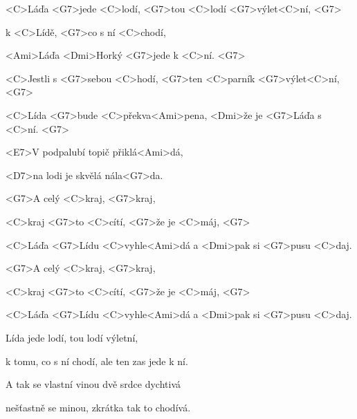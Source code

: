 
\zs
<C>Láďa <G7>jede <C>lodí, <G7>tou <C>lodí <G7>výlet<C>ní, <G7>

k <C>Lídě, <G7>co s ní <C>chodí,

<Ami>Láďa <Dmi>Horký <G7>jede k <C>ní. <G7>

<C>Jestli s <G7>sebou <C>hodí, <G7>ten <C>parník 
<G7>výlet<C>ní, <G7>

<C>Lída <G7>bude <C>překva<Ami>pena, <Dmi>že je 
<G7>Láďa s <C>ní. <G7>
\ks

\zr
<E7>V podpalubí topič přiklá<Ami>dá,

<D7>na lodi je skvělá nála<G7>da.

<G7>A celý <C>kraj, <G7>kraj,

<C>kraj <G7>to <C>cítí, <G7>že je <C>máj, <G7>

<C>Láďa <G7>Lídu <C>vyhle<Ami>dá a <Dmi>pak si 
<G7>pusu <C>daj.

<G7>A celý <C>kraj, <G7>kraj,

<C>kraj <G7>to <C>cítí, <G7>že je <C>máj, <G7>

<C>Láďa <G7>Lídu <C>vyhle<Ami>dá a <Dmi>pak si 
<G7>pusu <C>daj.
\kr

\zs
Lída jede lodí, tou lodí výletní,

k tomu, co s ní chodí, ale ten zas jede k ní.

A tak se vlastní vinou dvě srdce dychtivá

nešťastně se minou, zkrátka tak to chodívá.
\ks

\zr \kr

\kp

